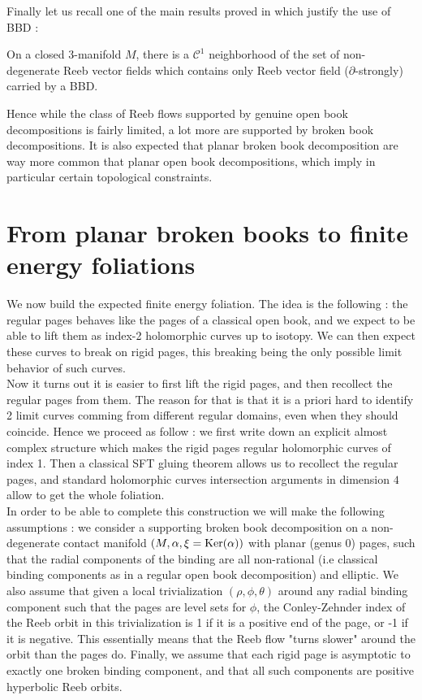\documentclass[../main.tex]{subfiles}
\begin{document}
Finally let us recall one of the main results proved in \cite{colin_existence_2022} which justify the use of BBD : 
\begin{theorem}
    On a closed 3-manifold $M$, there is a $\mathcal{C}^1$ neighborhood of the set of non-degenerate Reeb vector fields which contains only Reeb vector field ($\partial$-strongly) carried by a BBD. 
\end{theorem}

Hence while the class of Reeb flows supported by genuine open book decompositions is fairly limited, a lot more are supported by broken book decompositions. It is also expected that planar broken book decomposition are way more common that planar open book decompositions, which imply in particular certain topological constraints.

\section{From planar broken books to finite energy foliations}

We now build the expected finite energy foliation. The idea is the following : the regular pages behaves like the pages of a classical open book, and we expect to be able to lift them as index-2 holomorphic curves up to isotopy. We can then expect these curves to break on rigid pages, this breaking being the only possible limit behavior of such curves. \\

Now it turns out it is easier to first lift the rigid pages, and then recollect the regular pages from them. The reason for that is that it is a priori hard to identify 2 limit curves comming from different regular domains, even when they should coincide. Hence we proceed as follow : we first write down an explicit almost complex structure which makes the rigid pages regular holomorphic curves of index 1. Then a classical SFT gluing theorem allows us to recollect the regular pages, and standard holomorphic curves intersection arguments in dimension $4$ allow to get the whole foliation.\\

In order to be able to complete this construction we will make the following assumptions : we consider a supporting broken book decomposition on a non-degenerate contact manifold $(M,\alpha,\xi = \text{Ker}(\alpha))$ with planar (genus 0) pages, such that the radial components of the binding are all non-rational (i.e classical binding components as in a regular open book decomposition) and elliptic. We also assume that given a local trivialization $(\rho,\phi,\theta)$ around any radial binding component such that the pages are level sets for $\phi$, the Conley-Zehnder index of the Reeb orbit in this trivialization is 1 if it is a positive end of the page, or -1 if it is negative. This essentially means that the Reeb flow "turns slower" around the orbit than the pages do. Finally, we assume that each rigid page is asymptotic to exactly one broken binding component, and that all such components are positive hyperbolic Reeb orbits. \\
\end{document}
